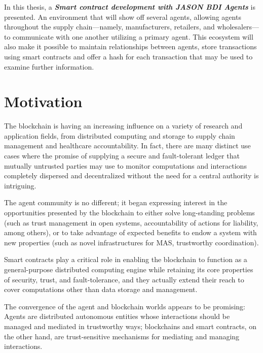 \vspace{.5cm}

In this thesis, a \textbf{\textit{Smart contract development with JASON \ac{BDI} Agents}} is presented. An environment that will show off several agents, allowing agents throughout the supply chain—namely, manufacturers, retailers, and wholesalers—to communicate with one another utilizing a primary agent. This ecosystem will also make it possible to maintain relationships between agents, store transactions using smart contracts and offer a hash for each transaction that may be used to examine further information.


\section{Motivation}

The blockchain is having an increasing influence on a variety of research and application fields, from distributed computing and storage to supply chain management and healthcare accountability. In fact, there are many distinct use cases where the promise of supplying a secure and fault-tolerant ledger that mutually untrusted parties may use to monitor computations and interactions completely dispersed and decentralized without the need for a central authority is intriguing. 

\vspace{.5cm}

The agent community is no different; it began expressing interest in the opportunities presented by the blockchain to either solve long-standing problems (such as trust management in open systems, accountability of actions for liability, among others), or to take advantage of expected benefits to endow a system with new properties (such as novel infrastructures for \ac{MAS}, trustworthy coordination).

\vspace{.5cm}

Smart contracts play a critical role in enabling the blockchain to function as a general-purpose distributed computing engine while retaining its core properties of security, trust, and fault-tolerance, and they actually extend their reach to cover computations other than data storage and management.

\vspace{.5cm}
The convergence of the agent and blockchain worlds appears to be promising: Agents are distributed autonomous entities whose interactions should be managed and mediated in trustworthy ways; blockchains and smart contracts, on the other hand, are trust-sensitive mechanisms for mediating and managing interactions.

